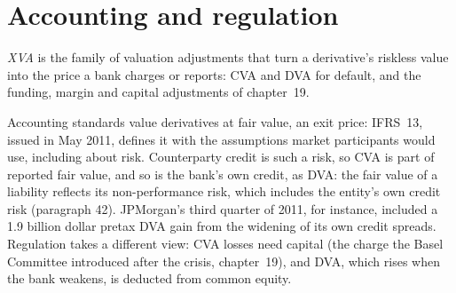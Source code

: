 \begin{omfigure}

\label{fig:rc:credit-and-debit-valuation-adjustments:cs01}
\end{omfigure}

\section{Accounting and regulation}

\begin{definition}[XVA]\label{def:rc:credit-and-debit-valuation-adjustments:xva}
\emph{XVA} is the family of valuation adjustments that turn a derivative's
riskless value into the price a bank charges or reports: CVA and DVA for default, and the
funding, margin and capital adjustments of chapter~19.
\end{definition}

Accounting standards value derivatives at fair value, an exit price: IFRS~13, issued in May
2011, defines it with the assumptions market participants would use, including about risk.
Counterparty credit is such a risk, so CVA is part of reported fair value, and so is the
bank's own credit, as DVA: the fair value of a liability reflects its non-performance risk, which
includes the entity's own credit risk (paragraph 42). JPMorgan's third quarter of 2011, for instance,
included a 1.9 billion dollar pretax DVA gain from the widening of its own credit spreads. Regulation takes a different view: CVA losses need capital (the
charge the Basel Committee introduced after the crisis, chapter~19), and DVA, which rises when
the bank weakens, is deducted from common equity.

